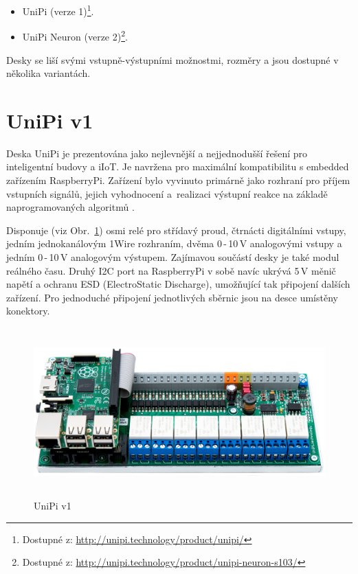 \begin{itemize}
	\item UniPi (verze 1)\footnote[1]{Dostupné z: \href{http://unipi.technology/product/unipi/}{http://unipi.technology/product/unipi/}}.
	\item UniPi Neuron (verze 2)\footnote[2]{Dostupné z: \href{http://unipi.technology/product/unipi-neuron-s103/}{http://unipi.technology/product/unipi-neuron-s103/}}.
\end{itemize}

\vspace{5mm}
Desky se liší svými vstupně-výstupními možnostmi, rozměry a jsou dostupné v několika variantách.




\section{UniPi v1}
\label{KapitolaUnipi1}

Deska UniPi je prezentována jako nejlevnější a nejjednodušší řešení pro inteligentní budovy a iIoT. Je navržena pro maximální kompatibilitu s embedded zařízením RaspberryPi. Zařízení bylo vyvinuto primárně jako rozhraní pro příjem vstupních signálů, jejich vyhodnocení a~realizaci výstupní reakce na základě naprogramovaných algoritmů \cite{UniPiBoard1}.

Disponuje (viz Obr.~\ref{ObrazekUnipiV1}) osmi relé pro střídavý proud, čtrnácti digitálními vstupy, jedním jednokanálovým 1Wire rozhraním, dvěma 0\,-\,10\,V analogovými vstupy a jedním 0\,-\,10\,V analogovým výstupem. Zajímavou součástí desky je také modul reálného času. Druhý I2C port na RaspberryPi v sobě navíc ukrývá 5\,V měnič napětí a ochranu ESD (ElectroStatic Discharge), umožňující tak připojení dalších zařízení. Pro jednoduché připojení jednotlivých sběrnic jsou na desce umístěny konektory.

 \begin{figure}[!ht]
  \begin{center}
    \includegraphics[height=6.5cm]{obrazky/unipi_v1}
  \end{center}
	\vspace{-20pt}
  \caption{UniPi v1 \cite{UniPiBoard1}}
	\label{ObrazekUnipiV1}
	\vspace{-30pt}
\end{figure}

